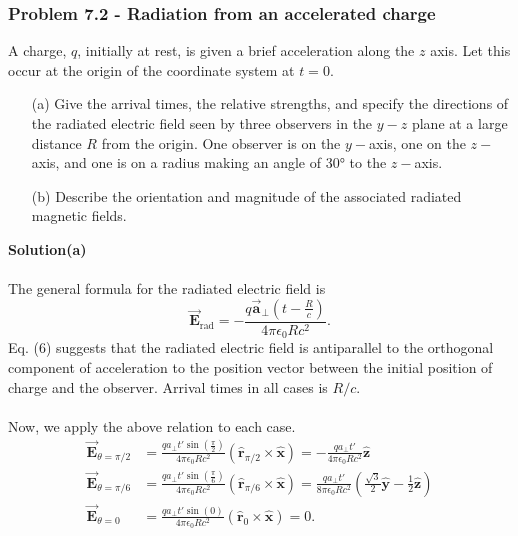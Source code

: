\documentclass[12pt,a4paper]{article}
\begin{document}
\subsubsection*{Problem 7.2 - Radiation from an accelerated charge}
A charge, $q$, initially at rest, is given a brief acceleration along the $z$ axis. Let this occur at the origin of the coordinate system at $t=0$.
\begin{enumerate}
    \item[(a)]Give the arrival times, the relative strengths, and specify the directions of the radiated electric field seen by three observers in the $y-z$ plane at a large distance $R$ from the origin. One observer is on the $y-$axis, one on the $z-$axis, and one is on a radius making an angle of 30° to the $z-$axis.
    \item[(b)]Describe the orientation and magnitude of the associated radiated magnetic fields.
\end{enumerate}
\textbf{Solution(a)}
\\
\\The general formula for the radiated electric field is
\begin{equation}
    \boldsymbol{\vec{E}}_{\text{rad}}=-\frac{q\boldsymbol{\vec{a}}_{\perp}\left(t-\frac{R}{c}\right)}{4\pi\epsilon_0Rc^2}.
\end{equation}
Eq. (6) suggests that the radiated electric field is antiparallel to the orthogonal component of acceleration to the position vector between the initial position of charge and the observer. Arrival times in all cases is $R/c$. 
\\
\\Now, we apply the above relation to each case.
\begin{equation}
    \begin{aligned}
        \boldsymbol{\vec{E}}_{\theta=\pi/2}&=\frac{qa_{\perp}t'\sin\left(\frac{\pi}{2}\right)}{4\pi\epsilon_0Rc^2}(\boldsymbol{\hat{r}}_{\pi/2}\times\boldsymbol{\hat{x}})=-\frac{qa_{\perp}t'}{4\pi\epsilon_0Rc^2}\boldsymbol{\hat{z}}\\
        \boldsymbol{\vec{E}}_{\theta=\pi/6}&=\frac{qa_{\perp}t'\sin\left(\frac{\pi}{6}\right)}{4\pi\epsilon_0Rc^2}(\boldsymbol{\hat{r}}_{\pi/6}\times\boldsymbol{\hat{x}})=\frac{qa_{\perp}t'}{8\pi\epsilon_0Rc^2}\left(\frac{\sqrt{3}}{2}\boldsymbol{\hat{y}}-\frac{1}{2}\boldsymbol{\hat{z}}\right)\\
        \boldsymbol{\vec{E}}_{\theta=0}&=\frac{qa_{\perp}t'\sin(0)}{4\pi\epsilon_0Rc^2}(\boldsymbol{\hat{r}}_0\times\boldsymbol{\hat{x}})=0.
    \end{aligned}
\end{equation}
\end{document}
